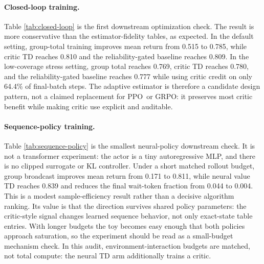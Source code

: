 \documentclass[11pt]{article}
\newcommand{\grpo}{\textsc{GRPO}}
\newcommand{\ppo}{\textsc{PPO}}
\begin{document}
\paragraph{Closed-loop training.}
Table \ref{tab:closed-loop} is the first downstream optimization check. The
result is more conservative than the estimator-fidelity tables, as expected. In
the default setting, group-total training improves mean return from 0.515 to
0.785, while critic TD reaches 0.810 and the reliability-gated baseline reaches 0.809.
In the low-coverage stress setting, group total reaches 0.769, critic TD reaches
0.780, and the reliability-gated baseline reaches 0.777 while using critic credit on only
64.4\% of final-batch steps. The adaptive estimator is therefore a candidate
design pattern, not a claimed replacement for \ppo\ or \grpo: it preserves most
critic benefit while making critic use explicit and auditable.

\begin{table}[!htbp]
\centering
\caption{Short-budget autoregressive sequence-policy training audit. A shared
one-hidden-layer MLP policy samples action tokens from prompt and
prefix-derived sequence state. Both methods use the same rollout budget; only
the token credit signal differs.}
\label{tab:sequence-policy}
\scriptsize

\end{table}

\paragraph{Sequence-policy training.}
Table \ref{tab:sequence-policy} is the smallest neural-policy downstream check.
It is not a transformer experiment: the actor is a tiny autoregressive MLP, and
there is no clipped surrogate or KL controller. Under a short matched rollout
budget, group broadcast improves mean return from 0.171 to 0.811, while neural
value TD reaches 0.839 and reduces the final wait-token fraction from 0.044 to
0.004. This is a modest sample-efficiency result rather than a decisive
algorithm ranking. Its value is that the direction survives shared policy
parameters: the critic-style signal changes learned sequence behavior, not only
exact-state table entries. With longer budgets the toy becomes easy enough that
both policies approach saturation, so the experiment should be read as a
small-budget mechanism check. In this audit, environment-interaction budgets
are matched, not total compute: the neural TD arm additionally trains a critic.
\end{document}
